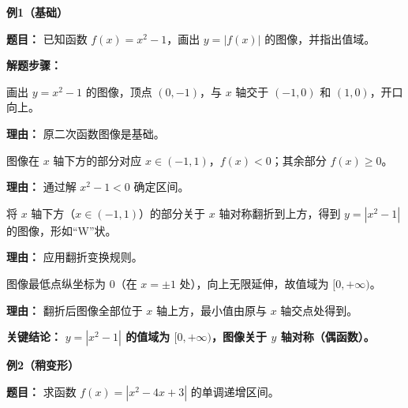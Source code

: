 \begin{examplebox}
	\textbf{\textcolor{CExample}{例1（基础）}}

	\textbf{\textcolor{CExample}{题目：}}
	已知函数 $f(x)=x^2-1$，画出 $y=|f(x)|$ 的图像，并指出值域。

	\textbf{\textcolor{CExample}{解题步骤：}}
	\begin{description}[style=nextline, leftmargin=2.8em, labelsep=0.5em, itemsep=0.45em]
		\item[\textbf{第一步（画原图像）：}] 画出 $y=x^2-1$ 的图像，顶点 $(0,-1)$，与 $x$ 轴交于 $(-1,0)$ 和 $(1,0)$，开口向上。
			\par\textbf{理由：} 原二次函数图像是基础。
		\item[\textbf{第二步（识别翻折区域）：}] 图像在 $x$ 轴下方的部分对应 $x\in(-1,1)$，$f(x)<0$；其余部分 $f(x)\ge0$。
			\par\textbf{理由：} 通过解 $x^2-1<0$ 确定区间。
		\item[\textbf{第三步（实施翻折）：}] 将 $x$ 轴下方（$x\in(-1,1)$）的部分关于 $x$ 轴对称翻折到上方，得到 $y=|x^2-1|$ 的图像，形如“W”状。
			\par\textbf{理由：} 应用翻折变换规则。
		\item[\textbf{第四步（写出值域）：}] 图像最低点纵坐标为 $0$（在 $x=\pm1$ 处），向上无限延伸，故值域为 $[0,+\infty)$。
			\par\textbf{理由：} 翻折后图像全部位于 $x$ 轴上方，最小值由原与 $x$ 轴交点处得到。
	\end{description}

	\textbf{\textcolor{CExample}{关键结论：}}
	\textbf{$y=|x^2-1|$ 的值域为 $[0,+\infty)$，图像关于 $y$ 轴对称（偶函数）。}

	\medskip
	\textbf{\textcolor{CExample}{例2（稍变形）}}

	\textbf{\textcolor{CExample}{题目：}}
	求函数 $f(x)=|x^2-4x+3|$ 的单调递增区间。


\end{examplebox}
